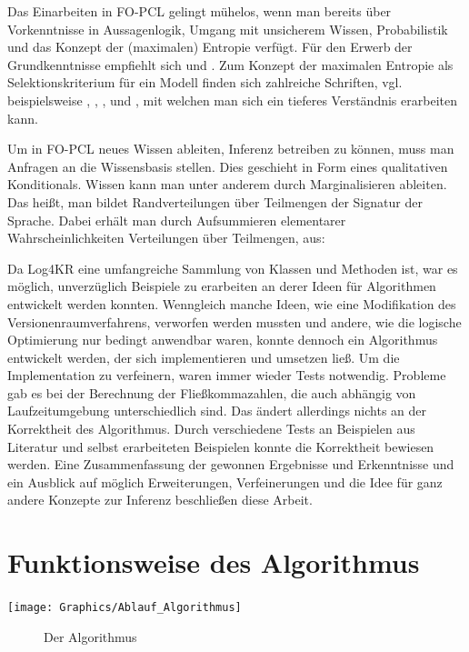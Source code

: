 \documentclass[a4paper, 11pt]{book}
\begin{document}
Das Einarbeiten in FO-PCL gelingt mühelos, wenn man bereits über Vorkenntnisse in Aussagenlogik, Umgang mit unsicherem Wissen, Probabilistik  und das Konzept der (maximalen) Entropie verfügt. Für den Erwerb der Grundkenntnisse empfiehlt sich \cite{BKI08} und \cite{KK06}. Zum Konzept der maximalen Entropie als Selektionskriterium für ein Modell finden sich zahlreiche Schriften, vgl. beispielsweise \cite{BHM14}, \cite{BK15}, \cite{Fis10}, \cite{RKI97} und \cite{TFLKIB10}, mit welchen man sich ein tieferes Verständnis erarbeiten kann.

Um in FO-PCL neues Wissen ableiten,  Inferenz betreiben zu können, muss man Anfragen an die Wissensbasis stellen. Dies geschieht in Form eines qualitativen Konditionals. Wissen kann man unter anderem durch Marginalisieren ableiten. Das heißt, man bildet Randverteilungen über Teilmengen der Signatur der Sprache. Dabei erhält man durch Aufsummieren elementarer Wahrscheinlichkeiten Verteilungen über Teilmengen, aus: \cite[Anhang A.2]{BKI08}

Da Log4KR eine umfangreiche Sammlung von Klassen und Methoden ist, war es möglich, unverzüglich Beispiele zu erarbeiten an derer Ideen für Algorithmen entwickelt werden konnten. Wenngleich manche Ideen, wie eine Modifikation des Versionenraumverfahrens, verworfen werden mussten und andere, wie die logische Optimierung nur bedingt anwendbar waren, konnte dennoch ein Algorithmus entwickelt werden, der sich implementieren und umsetzen ließ. Um die Implementation zu verfeinern, waren immer wieder Tests notwendig. Probleme gab es bei der Berechnung der Fließkommazahlen, die auch abhängig von Laufzeitumgebung unterschiedlich sind. Das ändert allerdings nichts an der Korrektheit des Algorithmus.
Durch verschiedene Tests an Beispielen aus Literatur und selbst erarbeiteten Beispielen konnte die Korrektheit bewiesen werden.
Eine Zusammenfassung der gewonnen Ergebnisse und Erkenntnisse und ein Ausblick auf möglich Erweiterungen, Verfeinerungen und die Idee für ganz andere Konzepte zur Inferenz beschließen diese Arbeit. 



\section{Funktionsweise des Algorithmus}
\texttt{[image: Graphics/Ablauf\_Algorithmus]}
\begin{figure}[h]\label{Algorithmus}
		\caption{Der Algorithmus }
\end{figure}
\end{document}
